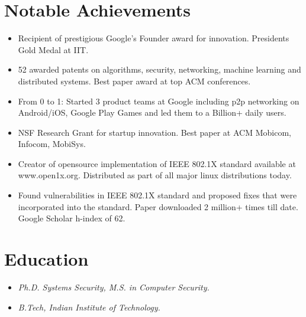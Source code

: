 \documentclass[letterpaper,9pt]{article}
\newcommand{\resumeItem}[1]{
  \item\small{
    {#1 \vspace{-2pt}}
  }
}
\begin{document}
\section{Notable Achievements}
    \begin{itemize}[leftmargin=3.5em, itemsep=0pt, label=\tiny$\bullet$]
     \resumeItem {Recipient of prestigious Google’s Founder award for innovation. Presidents Gold Medal at IIT.}
     \resumeItem {52 awarded patents on algorithms, security, networking, machine learning and distributed systems. Best paper award at top ACM conferences.}
     \resumeItem {From 0 to 1: Started 3 product teams at Google including p2p networking on Android/iOS, Google Play Games and led them to a Billion+ daily users.}
     \resumeItem {NSF Research Grant for startup innovation. Best paper at ACM Mobicom, Infocom, MobiSys.}
     \resumeItem {Creator of opensource implementation of IEEE 802.1X standard available at www.open1x.org. Distributed as part of all major linux distributions today.}
     \resumeItem {Found vulnerabilities in IEEE 802.1X standard and proposed fixes that were incorporated into the standard. Paper downloaded 2 million+ times till date. Google Scholar h-index of 62.}
   \end{itemize}



\section{Education}
  \begin{itemize}
    \item[] \textit{\small Ph.D. Systems Security, M.S. in Computer Security.}
    \item[] \textit{\small B.Tech, Indian Institute of Technology.}\hspace{2pt}{\small Guwahati, India.}
  \end{itemize}
\end{document}
